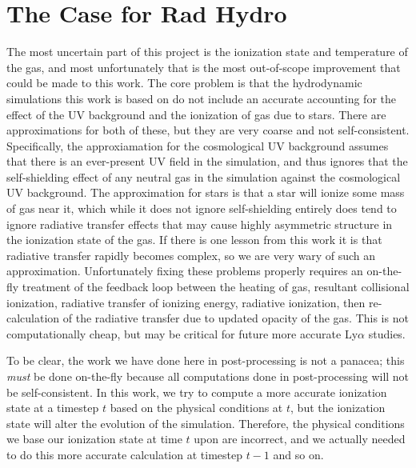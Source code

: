\section{The Case for Rad Hydro}
The most uncertain part of this project is the ionization state and temperature of the gas, and most unfortunately that is the most out-of-scope improvement that could be made to this work.
The core problem is that the hydrodynamic simulations this work is based on do not include an accurate accounting for the effect of the UV background and the ionization of gas due to stars.
There are approximations for both of these, but they are very coarse and not self-consistent.
Specifically, the approxiamation for the cosmological UV background assumes that there is an ever-present UV field in the simulation, and thus ignores that the self-shielding effect of any neutral gas in the simulation against the cosmological UV background.
The approximation for stars is that a star will ionize some mass of gas near it, which while it does not ignore self-shielding entirely does tend to ignore radiative transfer effects that may cause highly asymmetric structure in the ionization state of the gas.
If there is one lesson from this work it is that radiative transfer rapidly becomes complex, so we are very wary of such an approximation.
Unfortunately fixing these problems properly requires an on-the-fly treatment of the feedback loop between the heating of gas, resultant collisional ionization, radiative transfer of ionizing energy, radiative ionization, then re-calculation of the radiative transfer due to updated opacity of the gas.
This is not computationally cheap, but may be critical for future more accurate Ly$\alpha$ studies.

To be clear, the work we have done here in post-processing is not a panacea; this \emph{must} be done on-the-fly because all computations done in post-processing will not be self-consistent.
In this work, we try to compute a more accurate ionization state at a timestep $t$ based on the physical conditions at $t$, but the ionization state will alter the evolution of the simulation.
Therefore, the physical conditions we base our ionization state at time $t$ upon are incorrect, and we actually needed to do this more accurate calculation at timestep $t-1$ and so on.

